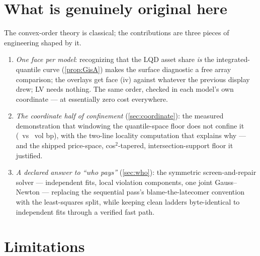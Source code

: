 \documentclass[11pt]{article}
\begin{document}
\section{What is genuinely original here}
\label{sec:original}

The convex-order theory is classical; the contributions are three
pieces of engineering shaped by it.
\begin{enumerate}[leftmargin=1.6em]
\item \emph{One face per model}: recognizing that the LQD asset share
\emph{is} the integrated-quantile curve (\cref{prop:GisA}) makes the
surface diagnostic a free array comparison; the overlays get face (iv)
against whatever the previous display drew; LV needs nothing.  The
same order, checked in each model's own coordinate --- at essentially
zero cost everywhere.
\item \emph{The coordinate half of confinement}
(\cref{sec:coordinate}): the measured demonstration that windowing the
quantile-space floor does not confine it (\calmdragwinbp\ vs
\calmdragpricebp\ vol bp), with the two-line locality computation that
explains why --- and the shipped price-space, cos$^{2}$-tapered,
intersection-support floor it justified.
\item \emph{A declared answer to ``who pays''} (\cref{sec:who}): the
symmetric screen-and-repair solver --- independent fits, local
violation components, one joint Gauss--Newton --- replacing the
sequential pass's blame-the-latecomer convention with the least-squares
split, while keeping clean ladders byte-identical to independent fits
through a verified fast path.
\end{enumerate}

\section{Limitations}
\label{sec:limits}
\end{document}
